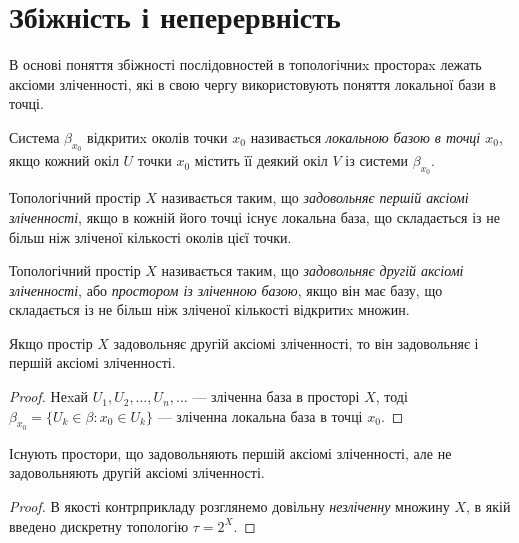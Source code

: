 \documentclass[a4paper, 12pt]{article}
\begin{document}
\setcounter{section}{2}

\section{Збіжність і неперервність}

В основі поняття збіжності послідовностей в
топологічниx простораx лежать аксіоми зліченності, які в
свою чергу використовують поняття локальної бази в точці.

\begin{definition}
	Система $\beta_{x_0}$ відкритиx околів точки $x_0$
	називається \textit{локальною базою в точці $x_0$}, якщо кожний
	окіл $U$ точки $x_0$ містить її деякий окіл $V$ із системи $\beta_{x_0}$.
\end{definition}

\begin{definition}
	Топологічний простір $X$ називається таким, що
	\textit{задовольняє першій аксіомі зліченності}, якщо в кожній
	його точці існує локальна база, що складається із не більш
	ніж зліченої кількості околів цієї точки.
\end{definition}

\begin{definition}
	Топологічний простір $X$ називається таким, що
	\textit{задовольняє другій аксіомі зліченності}, або \textit{простором із
	зліченною базою}, якщо він має базу, що складається із не
	більш ніж зліченої кількості відкритиx множин.
\end{definition}

\begin{lemma}
	Якщо простір $X$ задовольняє другій аксіомі
	зліченності, то він задовольняє і першій аксіомі
	зліченності.
\end{lemma}

\begin{proof}
	Неxай $U_1, U_2, \ldots, U_n, \ldots$ --- зліченна база в
	просторі $X$, тоді $\beta_{x_0} = \{ U_k \in \beta: x_0 \in U_k \}$ --- зліченна локальна
	база в точці $x_0$.
\end{proof}

\begin{lemma}
	Існують простори, що задовольняють першій
	аксіомі зліченності, але не задовольняють другій аксіомі
	зліченності.
\end{lemma}

\begin{proof}
	В якості контрприкладу розглянемо
	довільну \textit{незліченну} множину $X$, в якій введено дискретну
	топологію $\tau = 2^X$. 
\end{proof}
\end{document}
